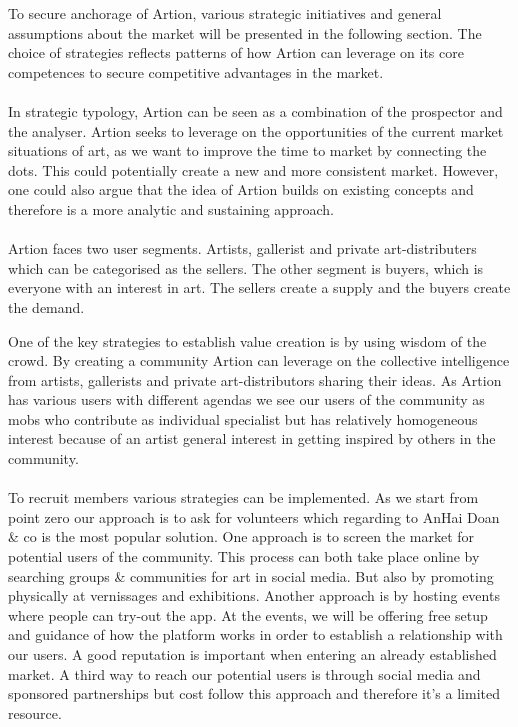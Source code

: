 To secure anchorage of Artion, various strategic initiatives and general assumptions about the market will be presented in the following section. The choice of strategies reflects patterns of how Artion can leverage on its core competences to secure competitive advantages in the market.
\\\\
In strategic typology, Artion can be seen as a combination of the prospector and the analyser. Artion seeks to leverage on the opportunities of the current market situations of art, as we want to improve the time to market by connecting the dots. This could potentially create a new and more consistent market. However, one could also argue that the idea of Artion builds on existing concepts and therefore is a more analytic and sustaining approach.
\\\\
Artion faces two user segments. Artists, gallerist and private art-distributers which can be categorised as the sellers. The other segment is buyers, which is everyone with an interest in art. The sellers create a supply and the buyers create the demand.

One of the key strategies to establish value creation is by using wisdom of the crowd. By creating a community Artion can leverage on the collective intelligence from artists, gallerists and private art-distributors sharing their ideas. As Artion has various users with different agendas we see our users of the community as mobs who contribute as individual specialist but has relatively homogeneous interest because of an artist general interest in getting inspired by others in the community. 
\\\\
To recruit members various strategies can be implemented. As we start from point zero our approach is to ask for volunteers which regarding to AnHai Doan & co is the most popular solution. One approach is to screen the market for potential users of the community. This process can both take place online by searching groups & communities for art in social media. But also by promoting physically at vernissages and exhibitions. Another approach is by hosting events where people can try-out the app. At the events, we will be offering free setup and guidance of how the platform works in order to establish a relationship with our users. A good reputation is important when entering an already established market. A third way to reach our potential users is through social media and sponsored partnerships but cost follow this approach and therefore it’s a limited resource. 

